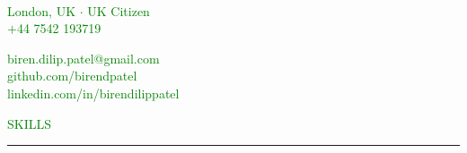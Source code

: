 \documentclass [
        11pt
] {article}
\begin{document}
\begin{multicols}{2}

\\
\noindent \textcolor{green}{London, UK $ \boldsymbol{\cdot} $ UK Citizen}\\
\noindent \textcolor{green}{$+$44 7542 193719}\\

\columnbreak

\hspace*{\fill} \noindent \textcolor{green}{biren.dilip.patel@gmail.com}\\
\hspace*{\fill} \noindent \textcolor{green}{github.com/birendpatel}\\
\hspace*{\fill} \noindent \textcolor{green}{linkedin.com/in/birendilippatel}

\end{multicols}


\noindent\textcolor{green}{SKILLS \rule{17cm}{1pt}}

\begin{multicols}{4}

\\
\\
\\
\\

\columnbreak

\\
\\
\\
\\

\columnbreak

\\
\\
\\
\\

\columnbreak

\\
\\
\\

\end{multicols}
\end{document}

